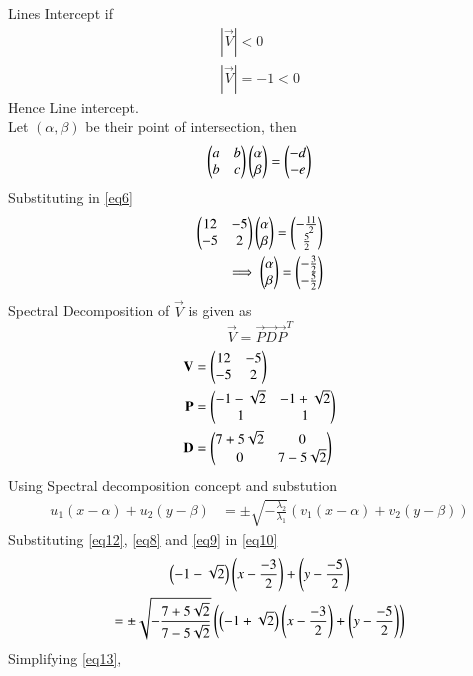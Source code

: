 \documentclass[journal,12pt,twocolumn]{IEEEtran}
\begin{document}
Lines Intercept if
\begin{align}
    |\vec{V}|<0\\
    |\vec{V}|=-1<0
\end{align}
Hence Line intercept.\\
Let $(\alpha,\beta)$ be their point of intersection, then
\begin{equation}\label{eq6}
	\begin{pmatrix} a & b\\ b & c\end{pmatrix}\begin{pmatrix}\alpha \\ \beta\end{pmatrix} = \begin{pmatrix}-d \\ -e\end{pmatrix}
\end{equation}
Substituting in \eqref{eq6}
\begin{align}
	\label{eq11}\begin{pmatrix} 12 & -5\\-5 & 2\end{pmatrix}\begin{pmatrix}\alpha \\ \beta\end{pmatrix} = \begin{pmatrix}-\frac{11}{2} \\ \frac{5}{2}\end{pmatrix} \\
	\label{eq12}\implies \begin{pmatrix}\alpha \\ \beta\end{pmatrix} = \begin{pmatrix}-\frac{3}{2} \\ -\frac{5}{2}\end{pmatrix}
\end{align}
Spectral Decomposition  of $\vec{V}$ is given as
\begin{equation}
\vec{V} = \vec{P}\vec{D}\vec{P}^T
\end{equation}
\begin{align}
	\label{eq7}\mathbf{V} &= \begin{pmatrix} 12 & -5\\ -5 & 2\end{pmatrix}\\
	\label{eq8}\mathbf{P} &= \begin{pmatrix}-1-\sqrt{2} & -1 + \sqrt{2}\\ 1 & 1\end{pmatrix}\\
	\label{eq9}\mathbf{D} &= \begin{pmatrix}7 + 5\sqrt{2} & 0\\ 0 & 7 - 5\sqrt{2}\end{pmatrix}
\end{align}
Using Spectral decomposition concept and substution
\begin{align}
u_1(x-\alpha) + u_2(y-\beta) &= \pm \sqrt{-\frac{\lambda_2}{\lambda_1}}(v_1(x-\alpha) + v_2(y-\beta))\label{eq10}
\end{align}
Substituting \eqref{eq12}, \eqref{eq8} and \eqref{eq9} in \eqref{eq10}
\begin{multline}\label{eq13}
	\left(-1-\sqrt{2}\right)\left(x- \frac{-3}{2}\right) + \left(y-\frac{-5}{2}\right) \\= \pm \sqrt{-\frac{7 +5\sqrt{2}} {7-5\sqrt{2}}}\left(\left(-1+\sqrt{2}\right)\left(x- \frac{-3}{2}\right) + \left(y-\frac{-5}{2}\right)\right)
\end{multline}
Simplifying \eqref{eq13},
\end{document}
